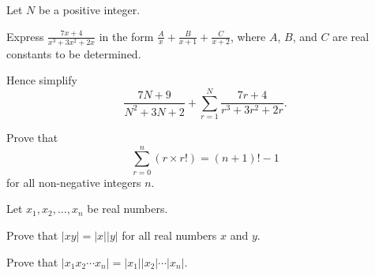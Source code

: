\begin{problem}
    Let $N$ be a positive integer.
    \begin{partquestions}{\roman*}
        \item Express $\frac{7x+4}{x^3+3x^2+2x}$ in the form $\frac{A}{x} + \frac{B}{x+1} + \frac{C}{x+2}$, where $A$, $B$, and $C$ are real constants to be determined.
        \item Hence simplify
        \[
            \frac{7N+9}{N^2+3N+2} + \sum_{r=1}^N \frac{7r+4}{r^3+3r^2+2r}.
        \]
    \end{partquestions}
\end{problem}

\begin{problem}
    Prove that
    \[
        \sum_{r=0}^n (r\times r!) = (n+1)! - 1
    \]
    for all non-negative integers $n$.
\end{problem}

\begin{problem}\label{problem-absolute-value-is-multiplicative-map}
    Let $x_1, x_2, \dots, x_n$ be real numbers.
    \begin{partquestions}{\roman*}
        \item Prove that $|xy| = |x||y|$ for all real numbers $x$ and $y$.
        \item Prove that $|x_1x_2\cdots x_n| = |x_1||x_2|\cdots|x_n|$.
    \end{partquestions}
\end{problem}
